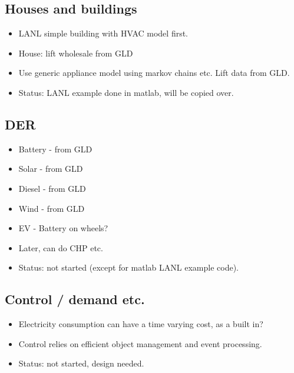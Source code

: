 \documentclass[12pt]{article}
\newcommand{\itm}[1]{\begin{itemize}#1\end{itemize}}
\begin{document}
\subsection{Houses and buildings}
\itm{
	\item LANL simple building with HVAC model first.
	\item House: lift wholesale from GLD
	\item Use generic appliance model using markov chains etc. Lift data from GLD.
	\item Status: LANL example done in matlab, will be copied over.
}
\subsection{DER}
\itm{
	\item Battery - from GLD
	\item Solar - from GLD
	\item Diesel - from GLD
	\item Wind - from GLD
	\item EV - Battery on wheels?
	\item Later, can do CHP etc.
	\item Status: not started (except for matlab LANL example code).
}

\subsection{Control / demand etc.}
\itm{
	\item Electricity consumption can have a time varying cost, as a built in?
	\item Control relies on efficient object management and event processing.
	\item Status: not started, design needed.
}
\newpage
\end{document}
